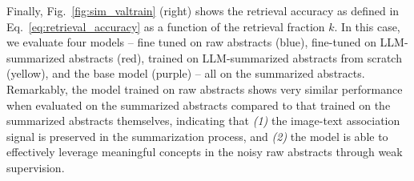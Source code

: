 \documentclass[10pt]{article} %
\begin{document}
Finally, Fig.~\ref{fig:sim_valtrain} (right) shows the retrieval accuracy as defined in Eq.~\ref{eq:retrieval_accuracy} as a function of the retrieval fraction $k$.
%
In this case, we evaluate four models -- fine tuned on raw abstracts (blue), fine-tuned on LLM-summarized abstracts (red), trained on LLM-summarized abstracts from scratch (yellow), and the base model (purple) -- all on the summarized abstracts.
%
Remarkably, the model trained on raw abstracts shows very similar performance when evaluated on the summarized abstracts compared to that trained on the summarized abstracts themselves, indicating that \emph{(1)} the image-text association signal is preserved in the summarization process, and \emph{(2)} the model is able to effectively leverage meaningful concepts in the noisy raw abstracts through weak supervision.
\end{document}
